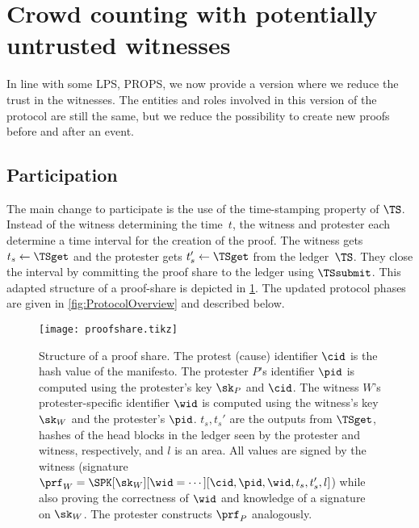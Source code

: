 \section{Crowd counting with potentially untrusted witnesses}%
\label{untrusted-witnesses-protocol}

In line with some \ac{LPS}, \eg \ac{PROPS}, we now provide a version where we 
reduce the trust in the witnesses.
The entities and roles involved in this version of the protocol are still the 
same, but we reduce the possibility to create new proofs before and after an 
event.


\subsection{Participation}%
\label{ProtocolDuring}

The main change to participate is the use of the time-stamping property of 
\(\TS\).
Instead of the witness determining the time~\(t\), the witness and protester 
each determine a time interval for the creation of the proof.
The witness gets \(t_s\gets \TSget\) and the protester gets \(t_s'\gets 
\TSget\) from the ledger~\(\TS\).
They close the interval by committing the proof share to the ledger using 
\(\TSsubmit\).
This adapted structure of a proof-share is depicted in \cref{fig:ProofFig}.
The updated protocol phases are given in \cref{fig:ProtocolOverview} and 
described below.

\begin{figure}
  \centering
  \small
  \texttt{[image: proofshare.tikz]}
  \caption{%
    Structure of a proof share.
    The protest (cause) identifier \(\cid\) is the hash value of the manifesto.
    The protester \(P\)'s identifier \(\pid\) is computed using the protester's key \(\sk_P\) and \(\cid\).
    The witness \(W\)'s protester-specific identifier \(\wid\) is computed using the
    witness's key \(\sk_W\) and the protester's \(\pid\).
    \(t_s, t_s'\) are the outputs from \(\TSget\), \eg hashes of the head 
    blocks in the ledger seen by the protester and witness, respectively, and 
    \(l\) is an area.
    All values are signed by the witness (signature \(\prf_W = \SPK[\sk_W][\wid 
      = \dotsb][\cid, \pid, \wid, t_s, t_s', l]\)) while also proving the 
    correctness of \(\wid\) and knowledge of a signature on \(\sk_W\).
    The protester constructs \(\prf_P\) analogously.
  }%
  \label{fig:ProofFig}
\end{figure}%


